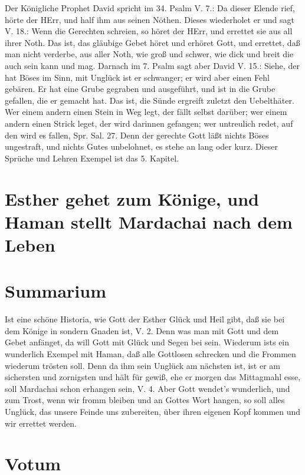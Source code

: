 Der Königliche Prophet David spricht im 34. Psalm V. 7.: Da dieser Elende rief, hörte der HErr, und half ihm aus seinen Nöthen. Dieses wiederholet er und sagt V. 18.: Wenn die Gerechten schreien, so höret der HErr, und errettet sie aus all ihrer Noth. Das ist, das gläubige Gebet höret und erhöret Gott, und errettet, daß man nicht verderbe, aus aller Noth, wie groß und schwer, wie dick und breit die auch sein kann und mag. Darnach im 7. Psalm sagt aber David V. 15.: Siehe, der hat Böses im Sinn, mit Unglück ist er schwanger; er wird aber einen Fehl gebären. Er hat eine Grube gegraben und ausgeführt, und ist in die Grube gefallen, die er gemacht hat. Das ist, die Sünde ergreift zuletzt den Uebelthäter. Wer einem andern einen Stein in Weg legt, der fällt selbst darüber; wer einem andern einen Strick leget, der wird darinnen gefangen; wer untreulich redet, auf den wird es fallen, Spr. Sal. 27. Denn der gerechte Gott läßt nichts Böses ungestraft, und nichts Gutes unbelohnet, es stehe an lang oder kurz. Dieser Sprüche und Lehren Exempel ist das 5. Kapitel.


\section[Esther gehet zum Könige, und Haman stellt Mardachai]{Esther gehet zum Könige, und Haman stellt Mardachai nach dem Leben}

\section{Summarium}

Ist eine schöne Historia, wie Gott der Esther Glück und Heil gibt, daß sie bei dem Könige in sondern Gnaden ist, V. 2. Denn was man mit Gott und dem Gebet anfänget, da will Gott mit Glück und Segen bei sein. Wiederum ists ein wunderlich Exempel mit Haman, daß alle Gottlosen schrecken und die Frommen wiederum trösten soll. Denn da ihm sein Unglück am nächsten ist, ist er am sichersten und zornigsten und hält für gewiß, ehe er morgen das Mittagmahl esse, soll Mardachai schon erhangen sein, V. 4. Aber Gott wendet’s wunderlich, und zum Trost, wenn wir fromm bleiben und an Gottes Wort hangen, so soll alles Unglück, das unsere Feinde uns zubereiten, über ihren eigenen Kopf kommen und wir errettet werden.

\section{Votum}

